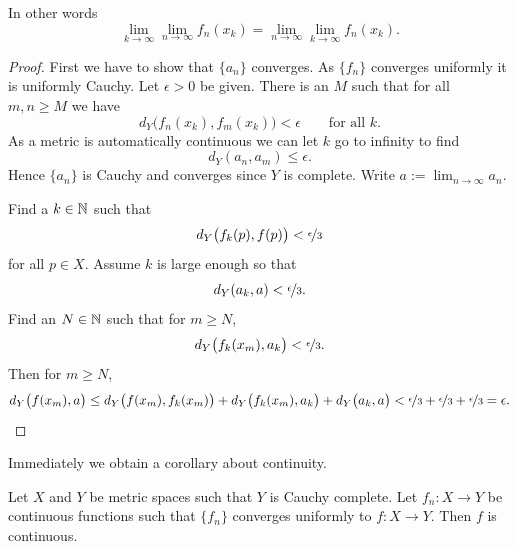In other words
\begin{equation*}
\lim_{k \to \infty} \lim_{n\to\infty} f_n(x_k) =
\lim_{n \to \infty} \lim_{k\to\infty} f_n(x_k) .
\end{equation*}

\begin{proof}
First we have to show that $\{ a_n \}$ converges.  As
$\{ f_n \}$ converges uniformly it is uniformly Cauchy. 
Let $\epsilon > 0$ be given.  There is
an $M$ such that for all $m,n \geq M$ we have
\begin{equation*}
d_Y\bigl(f_n(x_k),f_m(x_k)\bigr) < \epsilon \qquad \text{for all $k$} .
\end{equation*}
As a metric is automatically continuous we can let $k$ go to infinity
to find
\begin{equation*}
d_Y(a_n,a_m) \leq \epsilon .
\end{equation*}
Hence $\{a_n\}$ is Cauchy and converges since $Y$ is complete.  Write
$a := \lim_{n\to\infty} a_n$.

Find a $k \in {\mathbb{N}}$ such that
\begin{equation*}
d_Y\bigl(f_k(p),f(p)\bigr) < \nicefrac{\epsilon}{3}
\end{equation*}
for all $p \in X$.  Assume $k$ is large enough
so that
\begin{equation*}
d_Y(a_k,a) < \nicefrac{\epsilon}{3}  .
\end{equation*}
Find an $N \in {\mathbb{N}}$ such that for $m \geq N$,
\begin{equation*}
d_Y\bigl(f_k(x_m),a_k\bigr) < \nicefrac{\epsilon}{3}  .
\end{equation*}
Then for
$m \geq N$,
\begin{equation*}
d_Y\bigl(f(x_m),a\bigr)
\leq
d_Y\bigl(f(x_m),f_k(x_m)\bigr)
+
d_Y\bigl(f_k(x_m),a_k\bigr)
+
d_Y\bigl(a_k,a\bigr)
<
\nicefrac{\epsilon}{3} +
\nicefrac{\epsilon}{3} +
\nicefrac{\epsilon}{3} = \epsilon . \qedhere
\end{equation*}
\end{proof}

Immediately we obtain a corollary about continuity.

\begin{cor} \label{cor:metricuniformcontinuous}
Let $X$ and $Y$ be metric spaces such that $Y$ is Cauchy complete.
Let $f_n \colon X \to Y$ be continuous functions
such that
$\{ f_n \}$ converges uniformly to $f \colon X \to Y$.  
Then $f$ is continuous.
\end{cor}

